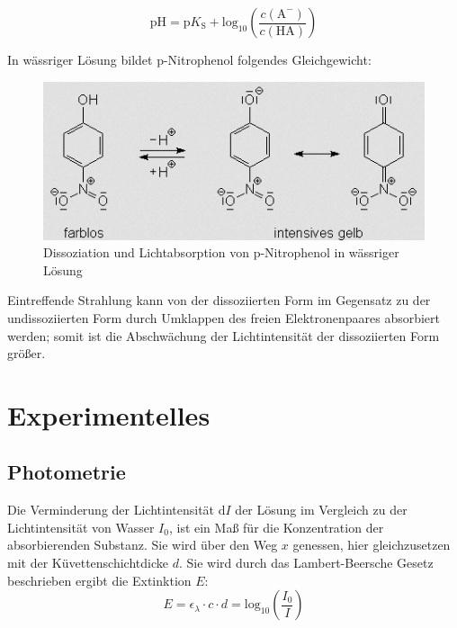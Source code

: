 \documentclass[12pt,a4paper,titlepage,headinclude,bibtotoc]{scrartcl}
\begin{document}
\begin{equation}
\mathrm{pH} = \mathrm{p}K_\mathrm{S} + \mathrm{log}_\mathrm{10}\left(\frac{c\mathrm{(A^-)}}{c\mathrm{(HA)}}\right)
\end{equation}

In wässriger Lösung bildet p-Nitrophenol folgendes Gleichgewicht: 

\begin{figure} [h!]
\begin{center}
\includegraphics[scale=1]{Strukturformel2.png} \end{center}
\caption {Dissoziation und Lichtabsorption von p-Nitrophenol in wässriger Lösung\,\protect\footnotemark}
\end{figure}


Eintreffende Strahlung kann von der dissoziierten Form im Gegensatz zu der undissoziierten Form durch Umklappen des freien Elektronenpaares absorbiert werden; somit ist die Abschwächung der Lichtintensität der dissoziierten Form größer.

\section{Experimentelles}
\subsection{Photometrie}
Die Verminderung der Lichtintensität $\mathrm{d}I$ der Lösung im Vergleich zu der Lichtintensität von Wasser $I_0$, ist ein Maß für die Konzentration der absorbierenden Substanz. Sie wird über den Weg $x$ genessen, hier gleichzusetzen mit der Küvettenschichtdicke $d$. Sie wird durch das Lambert-Beersche Gesetz beschrieben ergibt die Extinktion $E$:\\

\begin{equation}
E = \epsilon _{\lambda} \cdot c \cdot d = \mathrm{log_{10}}\left( \frac{I_0}{I}\right)
\end{equation}
\end{document}
